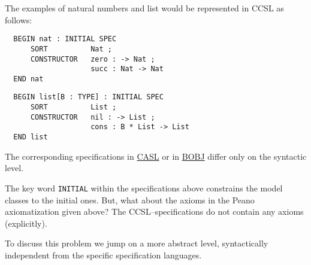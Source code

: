 \documentclass[landscape, autoslides, light]{mmiss}
\begin{document}
\begin{Package}[Label={FSDPT}, Title={Formal Specification of Data and Process Types}, ShortTitle={FSDPT}, Authors={Horst Reichel}, Date={February 2003}, LevelOfDetail=Lecture, Language=en-GB]
\begin{Section}[Title={Introduction}, Label={section2}]
\begin{Paragraph}[Title={Specification Languages and Tools}, Label=Paragraph20]
\end{Paragraph}
\end{Section}
\begin{Section}[Title={Initial Algebras as Data Types}, Label={section3}]

\begin{Section}[Title={Existence of initial models}, Label={section3_1}]
\begin{Paragraph}


\end{Paragraph}
\begin{Paragraph}[Title={First Examples}, Label=Paragraph21]

The examples of natural numbers and list would be represented in
CCSL as follows:

\begin{verbatim}
  BEGIN nat : INITIAL SPEC
      SORT          Nat ;
      CONSTRUCTOR   zero : -> Nat ;
                    succ : Nat -> Nat
  END nat
\end{verbatim}
\end{Paragraph}
\begin{Paragraph}[Label=Paragraph22]
\begin{verbatim}
  BEGIN list[B : TYPE] : INITIAL SPEC
      SORT          List ;
      CONSTRUCTOR   nil : -> List ;
                    cons : B * List -> List
  END list
\end{verbatim}


 The corresponding specifications in
\hyperlink{nat-casl}{CASL} or in \hyperlink{nat-bobj}{BOBJ} differ
only on the syntactic level.


\end{Paragraph}
\begin{Paragraph}[Label=Paragraph23]

The key word \texttt{INITIAL} within the specifications above
constrains the model classes to the initial ones. But, what about
the axioms in the Peano axiomatization given above? The
CCSL--specifications do not contain any axioms (explicitly). \\


\end{Paragraph}
\begin{Paragraph}[Label=Paragraph24]
To discuss this problem we jump on a more abstract level,
syntactically independent from the specific specification
languages.


\end{Paragraph}
\end{Section}
\end{Section}
\end{Package}
\end{document}
